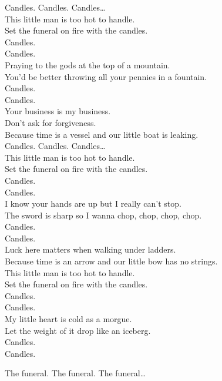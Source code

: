 


Candles. Candles. Candles… \\

This little man is too hot to handle. \\
Set the funeral on fire with the candles. \\
Candles. \\
Candles. \\
Praying to the gods at the top of a mountain. \\
You'd be better throwing all your pennies in a fountain. \\
Candles. \\
Candles. \\

Your business is my business. \\
Don't ask for forgiveness. \\
Because time is a vessel and our little boat is leaking. \\

Candles. Candles. Candles… \\

This little man is too hot to handle. \\
Set the funeral on fire with the candles. \\
Candles. \\
Candles. \\
I know your hands are up but I really can't stop. \\
The sword is sharp so I wanna chop, chop, chop, chop. \\
Candles. \\
Candles. \\

Luck here matters when walking under ladders. \\
Because time is an arrow and our little bow has no strings. \\

This little man is too hot to handle. \\
Set the funeral on fire with the candles. \\
Candles. \\
Candles. \\
My little heart is cold as a morgue. \\
Let the weight of it drop like an iceberg. \\
Candles. \\
Candles. \\




The funeral. The funeral. The funeral… \\
